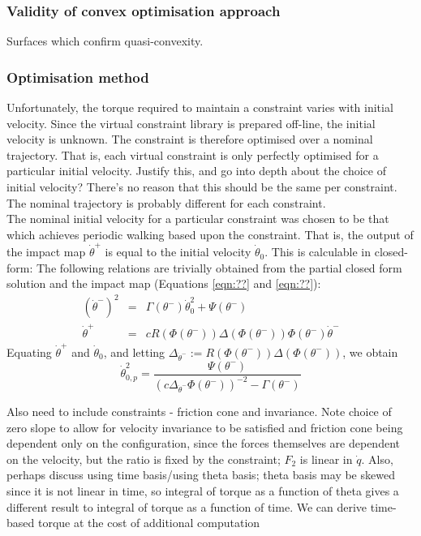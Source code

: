 \subsubsection{Validity of convex optimisation approach}
Surfaces which confirm quasi-convexity.

\subsubsection{Optimisation method}
Unfortunately, the torque required to maintain a constraint varies with initial velocity. Since the virtual constraint library is prepared off-line, the initial velocity is unknown. The constraint is therefore optimised over a nominal trajectory. That is, each virtual constraint is only perfectly optimised for a particular initial velocity. {\color{red} Justify this, and go into depth about the choice of initial velocity? There's no reason that this should be the same per constraint. The nominal trajectory is probably different for each constraint.} \\

The nominal initial velocity for a particular constraint was chosen to be that which achieves periodic walking based upon the constraint. That is, the output of the impact map $\dot{\theta}^+$ is equal to the initial velocity $\dot{\theta}_0$. This is calculable in closed-form: The following relations are trivially obtained from the partial closed form solution and the impact map (Equations \ref{eqn:??} and \ref{eqn:??}):
\begin{eqnarray}
	\left(\dot{\theta}^-\right)^2 &=& \Gamma(\theta^-)\dot{\theta}_0^2 + \Psi(\theta^-) \\
	\dot{\theta}^+ &=& cR(\Phi(\theta^-))\Delta(\Phi(\theta^-))\Phi(\theta^-)\dot{\theta}^-
\end{eqnarray}
Equating $\dot{\theta}^+$ and $\dot{\theta}_0$, and letting $\Delta_{\dot{\theta}^-} := R(\Phi(\theta^-))\Delta(\Phi(\theta^-))$, we obtain
\begin{equation}
	\dot{\theta}_{0,p}^2 = \frac{\Psi(\theta^-)}{(c\Delta_{\dot{\theta}^-}\Phi(\theta^-))^{-2} - \Gamma(\theta^-)}
\end{equation}

{\color{red} Also need to include constraints - friction cone and invariance. Note choice of zero slope to allow for velocity invariance to be satisfied and friction cone being dependent only on the configuration, since the forces themselves are dependent on the velocity, but the ratio is fixed by the constraint; $F_2$ is linear in $\dot{q}$. Also, perhaps discuss using time basis/using theta basis; theta basis may be skewed since it is not linear in time, so integral of torque as a function of theta gives a different result to integral of torque as a function of time. We can derive time-based torque at the cost of additional computation}



